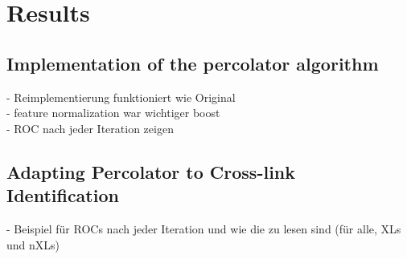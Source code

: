 \chapter{Results}
\label{results}


\section{Implementation of the percolator algorithm}
- Reimplementierung funktioniert wie Original\\
- feature normalization war wichtiger boost\\
- ROC nach jeder Iteration zeigen

\section{Adapting Percolator to Cross-link Identification}
\label{lab:results:pseudo_rocs}
- Beispiel für ROCs nach jeder Iteration und wie die zu lesen sind (für alle, XLs und nXLs)
